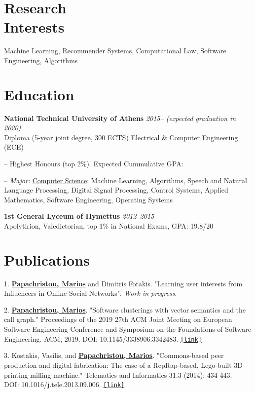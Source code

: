 \documentclass[margin]{res}
\newcommand{\field}[2]{\noindent \textbf{#1} \hfill #2 \\}
\begin{document}
\begin{resume}

\section{Research \\ Interests} Machine Learning, Recommender Systems, Computational Law, Software Engineering, Algorithms

\section{Education}
\field{National Technical University of Athens}  {\emph{2015-- (expected graduation in 2020)}} 
Diploma (5-year joint degree, 300 ECTS) Electrical \& Computer Engineering (ECE)
\begin{compactitem}
\item[--] Highest Honours (top 2\%). Expected Cummulative GPA:   
\item[--] \emph{Major:} \underline{Computer Science}: Machine Learning, Algorithms, Speech and Natural Language Processing, Digital Signal Processing, Control Systems, Applied Mathematics, Software Engineering, Operating Systems 
\end{compactitem} 
\field{1st General Lyceum of Hymettus} {\emph{2012--2015}} 
Apolytirion, Valedictorian, top 1\% in National Exams, GPA: 19.8/20


\section{Publications}

\begin{compactitem}
	\item[1.] \underline{\textbf{Papachristou, Marios}} and Dimitris Fotakis. "Learning user interests from Influencers in Online Social Networks". \emph{Work in progress}. 
    \item[2.] \underline{\textbf{Papachristou, Marios}}. "Software clusterings with vector semantics and the call graph." Proceedings of the 2019 27th ACM Joint Meeting on European Software Engineering Conference and Symposium on the Foundations of Software Engineering. ACM, 2019. DOI: 10.1145/3338906.3342483. \href{https://dl.acm.org/citation.cfm?id=3342483}{\nolinkurl{[link]}}
    \item[3.] Kostakis, Vasilis, and \underline{\textbf{Papachristou, Marios}}. "Commons-based peer production and digital fabrication: The case of a RepRap-based, Lego-built 3D printing-milling machine." Telematics and Informatics 31.3 (2014): 434-443. \\ DOI: 10.1016/j.tele.2013.09.006. \href{https://bit.ly/2JRoisV}{\nolinkurl{[link]}} \end{compactitem}



\end{resume}
\end{document}
